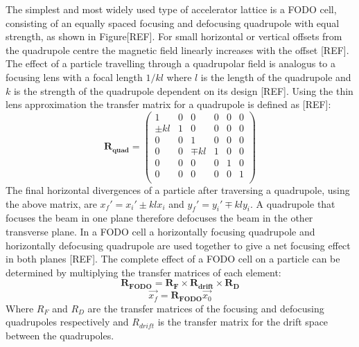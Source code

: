 The simplest and most widely used type of accelerator lattice is a FODO cell, consisting of an equally spaced focusing and defocusing quadrupole with equal strength, as shown in Figure[REF]. For small horizontal or vertical offsets from the quadrupole centre the magnetic field linearly increases with the offset [REF]. The effect of a particle travelling through a quadrupolar field is analogus to a focusing lens with a focal length \(1/kl\) where \(l\) is the length of the quadrupole and \(k\) is the strength of the quadrupole dependent on its design [REF]. Using the thin lens approximation the transfer matrix for a quadrupole is defined as [REF]:
\begin{equation}
\mathbf{R_{quad}}
=
\left( \begin{array}{cccccc} 
1 & 0 & 0 & 0 & 0 & 0\\
\pm kl & 1 & 0 & 0 & 0 & 0 \\
0 & 0 & 1 & 0 & 0 & 0 \\
0 & 0 & \mp kl & 1 & 0 & 0 \\
0 & 0 & 0 & 0 & 1 & 0 \\
0 & 0 & 0 & 0 & 0 & 1 \\
\end{array} \right)
\label{e:quadTransfer}
\end{equation}
The final horizontal divergences of a particle after traversing a quadrupole, using the above matrix, are \(x_f' = x_i' \pm klx_i\) and \(y_f' = y_i' \mp kly_i\). A quadrupole that focuses the beam in one plane therefore defocuses the beam in the other transverse plane. In a FODO cell a horizontally focusing quadrupole and horizontally defocusing quadrupole are used together to give a net focusing effect in both planes [REF]. The complete effect of a FODO cell on a particle can be determined by multiplying the transfer matrices of each element:
\begin{equation}
\mathbf{R_{FODO}} = \mathbf{R_{F} \times R_{drift} \times R_{D}}
\end{equation}
\begin{equation}
\vec{x_f} = \mathbf{R_{FODO}}\vec{x_0}
\end{equation}
Where \(R_{F}\) and \(R_{D}\) are the transfer matrices of the focusing and defocusing quadrupoles respectively and \(R_{drift}\) is the transfer matrix for the drift space between the quadrupoles. 

